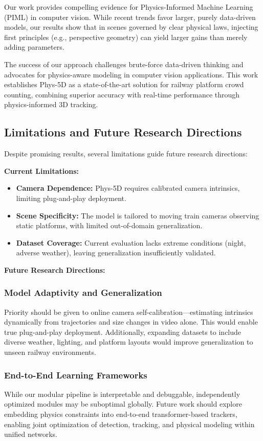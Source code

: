 Our work provides compelling evidence for Physics-Informed Machine Learning (PIML) in computer vision. While recent trends favor larger, purely data-driven models, our results show that in scenes governed by clear physical laws, injecting first principles (e.g., perspective geometry) can yield larger gains than merely adding parameters.

The success of our approach challenges brute-force data-driven thinking and advocates for physics-aware modeling in computer vision applications. This work establishes Phys-5D as a state-of-the-art solution for railway platform crowd counting, combining superior accuracy with real-time performance through physics-informed 3D tracking.

\subsection{Limitations and Future Research Directions}

Despite promising results, several limitations guide future research directions:

\textbf{Current Limitations:}
\begin{itemize}
    \item \textbf{Camera Dependence:} Phys-5D requires calibrated camera intrinsics, limiting plug-and-play deployment.
    \item \textbf{Scene Specificity:} The model is tailored to moving train cameras observing static platforms, with limited out-of-domain generalization.
    \item \textbf{Dataset Coverage:} Current evaluation lacks extreme conditions (night, adverse weather), leaving generalization insufficiently validated.
\end{itemize}

\textbf{Future Research Directions:}

\subsubsection{Model Adaptivity and Generalization}
Priority should be given to online camera self-calibration—estimating intrinsics dynamically from trajectories and size changes in video alone. This would enable true plug-and-play deployment. Additionally, expanding datasets to include diverse weather, lighting, and platform layouts would improve generalization to unseen railway environments.

\subsubsection{End-to-End Learning Frameworks}
While our modular pipeline is interpretable and debuggable, independently optimized modules may be suboptimal globally. Future work should explore embedding physics constraints into end-to-end transformer-based trackers, enabling joint optimization of detection, tracking, and physical modeling within unified networks.

